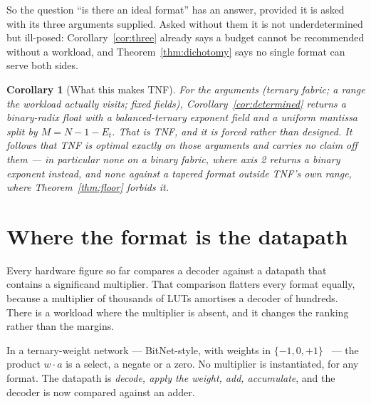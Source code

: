 \documentclass[11pt]{article}
\newtheorem{corollary}{Corollary}
\theoremstyle{definition}
\begin{document}
So the question ``is there an ideal format'' has an answer, provided it is asked
with its three arguments supplied. Asked without them it is not underdetermined
but ill-posed: Corollary~\ref{cor:three} already says a budget cannot be
recommended without a workload, and Theorem~\ref{thm:dichotomy} says no single
format can serve both sides.

\begin{corollary}[What this makes TNF]
\label{cor:whatitmakes}
For the arguments (ternary fabric; a range the workload actually visits; fixed
fields), Corollary~\ref{cor:determined} returns a binary-radix float with a
balanced-ternary exponent field and a uniform mantissa split by
$M = N - 1 - E_t$. That is TNF, and it is forced rather than designed. It follows
that TNF is optimal exactly on those arguments and carries no claim off them ---
in particular none on a binary fabric, where axis 2 returns a binary exponent
instead, and none against a tapered format outside TNF's own range, where
Theorem~\ref{thm:floor} forbids it.
\end{corollary}


\section{Where the format is the datapath}
\label{sec:ternarynet}

Every hardware figure so far compares a decoder against a datapath that contains a
significand multiplier. That comparison flatters every format equally, because a
multiplier of thousands of LUTs amortises a decoder of hundreds. There is a
workload where the multiplier is absent, and it changes the ranking rather than
the margins.

In a ternary-weight network --- BitNet-style, with weights in
$\{-1, 0, +1\}$~\cite{bitnet} --- the product $w \cdot a$ is a select, a negate or
a zero. No multiplier is instantiated, for any format. The datapath is
\emph{decode, apply the weight, add, accumulate}, and the decoder is now compared
against an adder.
\end{document}
